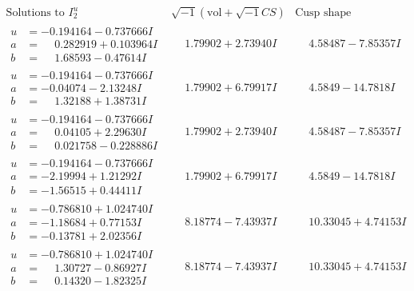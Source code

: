\documentclass[1p]{elsarticle_modified}
\theoremstyle{definition}
\newcommand{\I}{\sqrt{-1}}
\begin{document}
$$\begin{array}{c|c|c}
\text{Solutions to }I^u_{2}& \I (\text{vol} + \sqrt{-1}CS) & \text{Cusp shape}\\
 \hline 
\begin{aligned}
u &= -0.194164 - 0.737666 I \\
a &= \phantom{-}0.282919 + 0.103964 I \\
b &= \phantom{-}1.68593 - 0.47614 I\end{aligned}
 & \phantom{-}1.79902 + 2.73940 I & \phantom{-}4.58487 - 7.85357 I \\ \hline\begin{aligned}
u &= -0.194164 - 0.737666 I \\
a &= -0.04074 - 2.13248 I \\
b &= \phantom{-}1.32188 + 1.38731 I\end{aligned}
 & \phantom{-}1.79902 + 6.79917 I & \phantom{-}4.5849 - 14.7818 I \\ \hline\begin{aligned}
u &= -0.194164 - 0.737666 I \\
a &= \phantom{-}0.04105 + 2.29630 I \\
b &= \phantom{-}0.021758 - 0.228886 I\end{aligned}
 & \phantom{-}1.79902 + 2.73940 I & \phantom{-}4.58487 - 7.85357 I \\ \hline\begin{aligned}
u &= -0.194164 - 0.737666 I \\
a &= -2.19994 + 1.21292 I \\
b &= -1.56515 + 0.44411 I\end{aligned}
 & \phantom{-}1.79902 + 6.79917 I & \phantom{-}4.5849 - 14.7818 I \\ \hline\begin{aligned}
u &= -0.786810 + 1.024740 I \\
a &= -1.18684 + 0.77153 I \\
b &= -0.13781 + 2.02356 I\end{aligned}
 & \phantom{-}8.18774 - 7.43937 I & \phantom{-}10.33045 + 4.74153 I \\ \hline\begin{aligned}
u &= -0.786810 + 1.024740 I \\
a &= \phantom{-}1.30727 - 0.86927 I \\
b &= \phantom{-}0.14320 - 1.82325 I\end{aligned}
 & \phantom{-}8.18774 - 7.43937 I & \phantom{-}10.33045 + 4.74153 I \\ \hline\begin{aligned}

\end{aligned}
\end{array}$$
\end{document}
